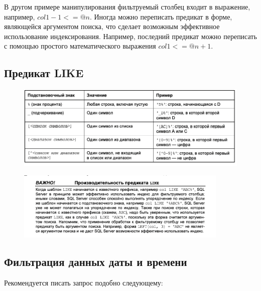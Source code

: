В другом примере манипулирования фильтруемый столбец входит в выражение,
например, $col1 - 1 <= @n$. Иногда можно переписать предикат в форме, являющейся аргументом поиска, что сделает возможным эффективное использование индексирования. Например, последний предикат можно переписать с помощью простого
математического выражения $col1 <= @n + 1$.


\subsection{Предикат LIKE}


\begin{figure}[h!]
	\begin{center}
		\includegraphics[width=1\textwidth]{img/like.png}
	\end{center}
	\captionsetup{justification=centering}
\end{figure}

\newpage
\begin{figure}[h!]
	\begin{center}
		\includegraphics[width=0.9\textwidth]{img/advice4.png}
	\end{center}
	\captionsetup{justification=centering}
\end{figure}



\subsection{Фильтрация данных даты и времени}

Рекомендуется писать запрос подобно следующему: 

